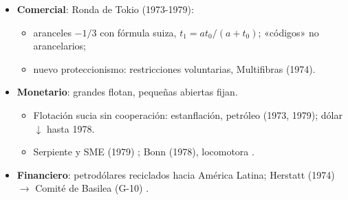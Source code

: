 \documentclass{article}
\begin{document}
\begin{columnas}
\begin{itemize}
\item \textbf{Comercial}: Ronda de Tokio (1973-1979):
  \begin{itemize}
  \item aranceles $-1/3$ con fórmula suiza, $t_1=at_0/(a+t_0)$; «códigos» no arancelarios;
  \item nuevo proteccionismo: restricciones voluntarias, Multifibras (1974).
  \end{itemize}
\item \textbf{Monetario}: grandes flotan, pequeñas abiertas fijan.
  \begin{itemize}
  \item Flotación sucia sin cooperación: estanflación, petróleo (1973, 1979); dólar $\downarrow$ hasta 1978.
  \item Serpiente y SME (1979) ; Bonn (1978), locomotora .
  \end{itemize}
\item \textbf{Financiero}: petrodólares reciclados hacia América Latina; Herstatt (1974) $\to$ Comité de Basilea (G-10) .
\end{itemize}


\end{columnas}
\end{document}

